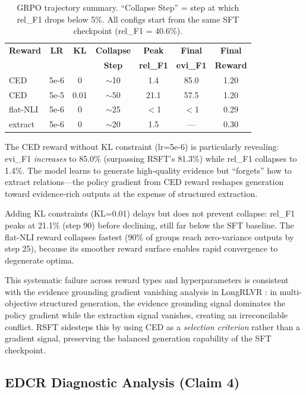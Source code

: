 \documentclass[11pt,a4paper]{article}
\begin{document}
\begin{table}[t]
\centering
\small
\begin{tabular}{lcccccc}
\toprule
\textbf{Reward} & \textbf{LR} & \textbf{KL} & \textbf{Collapse} & \textbf{Peak} & \textbf{Final} & \textbf{Final} \\
& & & \textbf{Step} & \textbf{rel\_F1} & \textbf{evi\_F1} & \textbf{Reward} \\
\midrule
CED & 5e-6 & 0 & $\sim$10 & 1.4 & 85.0 & 1.20 \\
CED & 5e-5 & 0.01 & $\sim$50 & 21.1 & 57.5 & 1.20 \\
flat-NLI & 5e-6 & 0 & $\sim$25 & $<$1 & $<$1 & 0.29 \\
extract & 5e-6 & 0 & $\sim$20 & 1.5 & --- & 0.30 \\
\bottomrule
\end{tabular}
\caption{GRPO trajectory summary. ``Collapse Step'' = step at which rel\_F1 drops below 5\%. All configs start from the same SFT checkpoint (rel\_F1 = 40.6\%).}
\label{tab:grpo}
\end{table}

The CED reward without KL constraint (lr=5e-6) is particularly revealing: evi\_F1 \emph{increases} to 85.0\% (surpassing RSFT's 81.3\%) while rel\_F1 collapses to 1.4\%. The model learns to generate high-quality evidence but ``forgets'' how to extract relations---the policy gradient from CED reward reshapes generation toward evidence-rich outputs at the expense of structured extraction.

Adding KL constraints (KL=0.01) delays but does not prevent collapse: rel\_F1 peaks at 21.1\% (step 90) before declining, still far below the SFT baseline. The flat-NLI reward collapses fastest (90\% of groups reach zero-variance outputs by step 25), because its smoother reward surface enables rapid convergence to degenerate optima.

This systematic failure across reward types and hyperparameters is consistent with the evidence grounding gradient vanishing analysis in LongRLVR \cite{song2026longrlvr}: in multi-objective structured generation, the evidence grounding signal dominates the policy gradient while the extraction signal vanishes, creating an irreconcilable conflict. RSFT sidesteps this by using CED as a \emph{selection criterion} rather than a gradient signal, preserving the balanced generation capability of the SFT checkpoint.

\subsection{EDCR Diagnostic Analysis (Claim 4)}
\label{sec:edcr}
\end{document}

